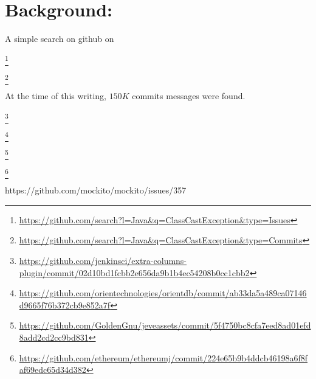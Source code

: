 
\chapter{Background: }

\label{cha:background}

A simple search on github on 

\footnote{\url{https://github.com/search?l=Java&q=ClassCastException&type=Issues}}

\footnote{\url{https://github.com/search?l=Java&q=ClassCastException&type=Commits}}

At the time of this writing, \circa{} $150K$ commits messages were found.

\footnote{\url{https://github.com/jenkinsci/extra-columns-plugin/commit/02d10bd1fcbb2e656da9b1b4ec54208b0cc1cbb2}}

\footnote{\url{https://github.com/orientechnologies/orientdb/commit/ab33da5a489ca07146d9665f76b372cb9e852a7f}}

\footnote{\url{https://github.com/GoldenGnu/jeveassets/commit/5f4750bc8cfa7eed8ad01efd8add2cd2cc9bd831}}

\footnote{\url{https://github.com/ethereum/ethereumj/commit/224e65b9b4ddcb46198a6f8faf69edc65d34d382}}



https://github.com/mockito/mockito/issues/357
